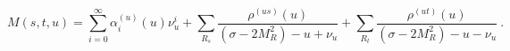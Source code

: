 \begin{equation}
M(s,t,u) =
 \sum\limits_{i=0}^{\infty}{\alpha}^{(u)}_i(u) {\nu}_u^i +
 \sum\limits_{R_s}^{}
      \frac{\rho^{(us)}(u)}{(\sigma - 2M^2_R)-u+{\nu}_u} +
 \sum\limits_{R_t}^{}
      \frac{\rho^{(ut)}(u)}{(\sigma - 2M^2_R)-u-{\nu}_u}\ .
\label{1.12}
\end{equation}

